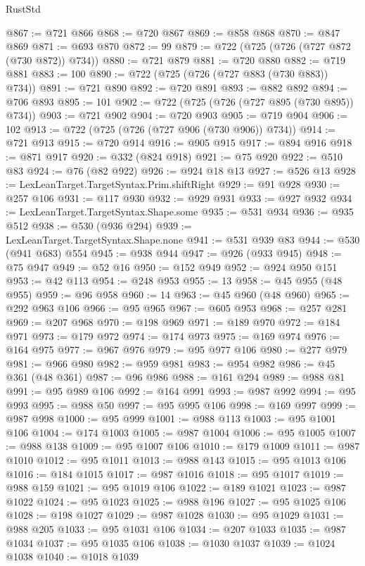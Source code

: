 \begin{lexlean}{RustStd}
\begin{coremodule}
@867 := @721 @866
@868 := @720 @867
@869 := @858 @868
@870 := @847 @869
@871 := @693 @870
@872 := 99
@879 := @722 (@725 (@726 (@727 @872 (@730 @872)) @734))
@880 := @721 @879
@881 := @720 @880
@882 := @719 @881
@883 := 100
@890 := @722 (@725 (@726 (@727 @883 (@730 @883)) @734))
@891 := @721 @890
@892 := @720 @891
@893 := @882 @892
@894 := @706 @893
@895 := 101
@902 := @722 (@725 (@726 (@727 @895 (@730 @895)) @734))
@903 := @721 @902
@904 := @720 @903
@905 := @719 @904
@906 := 102
@913 := @722 (@725 (@726 (@727 @906 (@730 @906)) @734))
@914 := @721 @913
@915 := @720 @914
@916 := @905 @915
@917 := @894 @916
@918 := @871 @917
@920 := @332 (@824 @918)
@921 := @75 @920
@922 := @510 @83
@924 := @76 (@82 @922)
@926 := @924 @18 @13
@927 := @526 @13
@928 := LexLeanTarget.TargetSyntax.Prim.shiftRight
@929 := @91 @928
@930 := @257 @106
@931 := @117 @930
@932 := @929 @931
@933 := @927 @932
@934 := LexLeanTarget.TargetSyntax.Shape.some
@935 := @531 @934
@936 := @935 @512
@938 := @530 (@936 @294)
@939 := LexLeanTarget.TargetSyntax.Shape.none
@941 := @531 @939 @83
@944 := @530 (@941 @683) @554
@945 := @938 @944
@947 := @926 (@933 @945)
@948 := @75 @947
@949 := @52 @16
@950 := @152 @949
@952 := @924 @950 @151
@953 := @42 @113
@954 := @248 @953
@955 := 13
@958 := @45 @955 (@48 @955)
@959 := @96 @958
@960 := 14
@963 := @45 @960 (@48 @960)
@965 := @292 @963 @106
@966 := @95 @965
@967 := @605 @953
@968 := @257 @281
@969 := @207 @968
@970 := @198 @969
@971 := @189 @970
@972 := @184 @971
@973 := @179 @972
@974 := @174 @973
@975 := @169 @974
@976 := @164 @975
@977 := @967 @976
@979 := @95 @977 @106
@980 := @277 @979
@981 := @966 @980
@982 := @959 @981
@983 := @954 @982
@986 := @45 @361 (@48 @361)
@987 := @96 @986
@988 := @161 @294
@989 := @988 @81
@991 := @95 @989 @106
@992 := @164 @991
@993 := @987 @992
@994 := @95 @993
@995 := @988 @50
@997 := @95 @995 @106
@998 := @169 @997
@999 := @987 @998
@1000 := @95 @999
@1001 := @988 @113
@1003 := @95 @1001 @106
@1004 := @174 @1003
@1005 := @987 @1004
@1006 := @95 @1005
@1007 := @988 @138
@1009 := @95 @1007 @106
@1010 := @179 @1009
@1011 := @987 @1010
@1012 := @95 @1011
@1013 := @988 @143
@1015 := @95 @1013 @106
@1016 := @184 @1015
@1017 := @987 @1016
@1018 := @95 @1017
@1019 := @988 @159
@1021 := @95 @1019 @106
@1022 := @189 @1021
@1023 := @987 @1022
@1024 := @95 @1023
@1025 := @988 @196
@1027 := @95 @1025 @106
@1028 := @198 @1027
@1029 := @987 @1028
@1030 := @95 @1029
@1031 := @988 @205
@1033 := @95 @1031 @106
@1034 := @207 @1033
@1035 := @987 @1034
@1037 := @95 @1035 @106
@1038 := @1030 @1037
@1039 := @1024 @1038
@1040 := @1018 @1039

\end{coremodule}
\end{lexlean}
